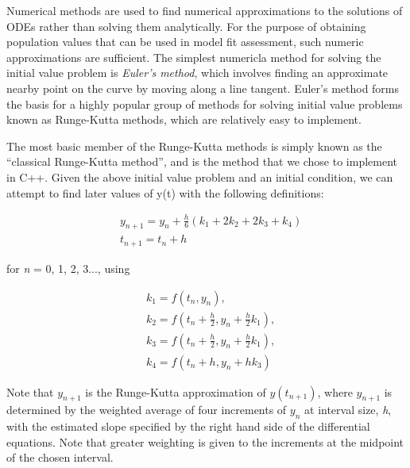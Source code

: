 \documentclass[11pt, a4paper, oneside,titlepage]{article}
\begin{document}
\begin{framed}
Numerical methods are used to find numerical approximations to the
solutions of ODEs rather than solving them analytically. For the
purpose of obtaining population values that can be used in model fit
assessment, such numeric approximations are sufficient. The simplest
numericla method for solving the initial value problem is \emph
{Euler's method}, which involves finding an approximate nearby point
on the curve by moving along a line tangent. Euler's method forms
the basis for a highly popular group of
methods for solving initial value problems known as Runge-Kutta
methods, which are relatively easy to implement. 

The most basic member of the Runge-Kutta methods is simply known as
the ``classical Runge-Kutta method'', and is the method that we chose
to implement in C++. Given the above initial value problem and an
initial condition, we can attempt to find later values of y(t) with
the following definitions:

\begin{equation}
\begin{split}
  &y_{n+1} = y_n + \frac{h}{6}(k_1 + 2k_2 + 2k_3 + k_4)\\
  &t_{n+1} = t_n + h
 \end{split}
\end{equation}

for \emph{n} = 0, 1, 2, 3..., using

\begin{equation}
\begin{split}
  &k_1 = f(t_n,y_n),\\
  &k_2 = f(t_n + \frac{h}{2},y_n+ \frac{h}{2}k_1),\\
  &k_3 = f(t_n + \frac{h}{2},y_n+ \frac{h}{2}k_1),\\
  &k_4 = f(t_n+h,y_n+hk_3)
\end{split}
\end{equation}

Note that $y_{n+1}$ is the Runge-Kutta approximation of $y(t_{n+1})$,
where $y_{n+1}$ is determined by the weighted average of four
increments of $y_n$ at interval size, \emph{h}, with the estimated
slope specified by the right hand side of the differential
equations. Note that greater weighting is given to the increments at
the midpoint of the chosen interval.
\end{framed}
\end{document}

